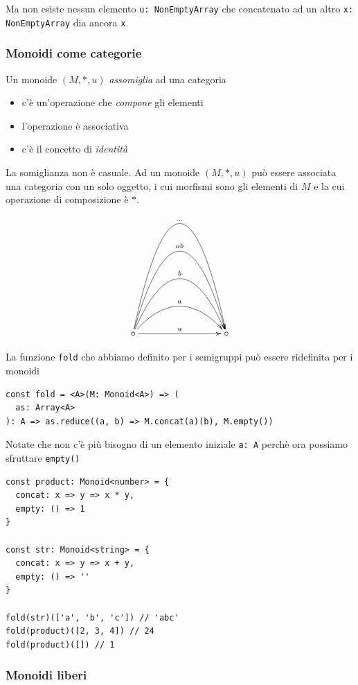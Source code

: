 \documentclass[12pt]{article}
\begin{document}
Ma non esiste nessun elemento \texttt{u: NonEmptyArray} che concatenato ad un altro \texttt{x: NonEmptyArray} dia ancora \texttt{x}.

\subsubsection{Monoidi come categorie}

Un monoide $(M, *, u)$ \emph{assomiglia} ad una categoria

\begin{itemize}
  \item c'è un'operazione che \emph{compone} gli elementi
  \item l'operazione è associativa
  \item c'è il concetto di \emph{identità}
\end{itemize}

La somiglianza non è casuale. Ad un monoide $(M, *, u)$ può essere associata una categoria con un solo oggetto,
i cui morfismi sono gli elementi di $M$ e la cui operazione di composizione è $*$.

\[
\xymatrixrowsep{3cm}
\xymatrixcolsep{3cm}
\xymatrix{
  \circ \ar[r]^u \ar@/^1cm/[r]^a \ar@/^2cm/[r]^b \ar@/^3cm/[r]^{ab} \ar@/^4cm/[r]^{\ldots} & \circ
}
\]

La funzione \texttt{fold} che abbiamo definito per i semigruppi può essere ridefinita per i monoidi

\begin{verbatim}
const fold = <A>(M: Monoid<A>) => (
  as: Array<A>
): A => as.reduce((a, b) => M.concat(a)(b), M.empty())
\end{verbatim}

Notate che non c'è più bisogno di un elemento iniziale \texttt{a: A} perchè ora possiamo sfruttare \texttt{empty()}

\begin{verbatim}
const product: Monoid<number> = {
  concat: x => y => x * y,
  empty: () => 1
}

const str: Monoid<string> = {
  concat: x => y => x + y,
  empty: () => ''
}

fold(str)(['a', 'b', 'c']) // 'abc'
fold(product)([2, 3, 4]) // 24
fold(product)([]) // 1
\end{verbatim}

\subsubsection{Monoidi liberi}
\end{document}

